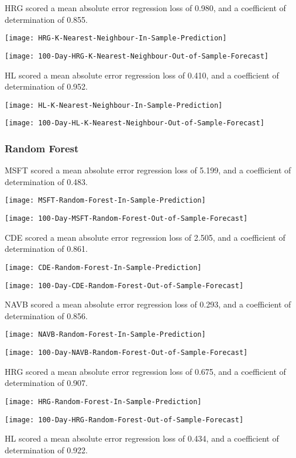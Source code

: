 HRG scored a mean absolute error regression loss of 0.980, and a coefficient of determination of 0.855.

\texttt{[image: HRG-K-Nearest-Neighbour-In-Sample-Prediction]}

\texttt{[image: 100-Day-HRG-K-Nearest-Neighbour-Out-of-Sample-Forecast]}

HL scored a mean absolute error regression loss of 0.410, and a coefficient of determination of 0.952.

\texttt{[image: HL-K-Nearest-Neighbour-In-Sample-Prediction]}

\texttt{[image: 100-Day-HL-K-Nearest-Neighbour-Out-of-Sample-Forecast]}

\subsubsection{Random Forest}
MSFT scored a mean absolute error regression loss of 5.199, and a coefficient of determination of 0.483.

\texttt{[image: MSFT-Random-Forest-In-Sample-Prediction]}

\texttt{[image: 100-Day-MSFT-Random-Forest-Out-of-Sample-Forecast]}

CDE scored a mean absolute error regression loss of 2.505, and a coefficient of determination of 0.861.

\texttt{[image: CDE-Random-Forest-In-Sample-Prediction]}

\texttt{[image: 100-Day-CDE-Random-Forest-Out-of-Sample-Forecast]}

NAVB scored a mean absolute error regression loss of 0.293, and a coefficient of determination of 0.856.

\texttt{[image: NAVB-Random-Forest-In-Sample-Prediction]}

\texttt{[image: 100-Day-NAVB-Random-Forest-Out-of-Sample-Forecast]}

HRG scored a mean absolute error regression loss of 0.675, and a coefficient of determination of 0.907.

\texttt{[image: HRG-Random-Forest-In-Sample-Prediction]}

\texttt{[image: 100-Day-HRG-Random-Forest-Out-of-Sample-Forecast]}

HL scored a mean absolute error regression loss of 0.434, and a coefficient of determination of 0.922.

